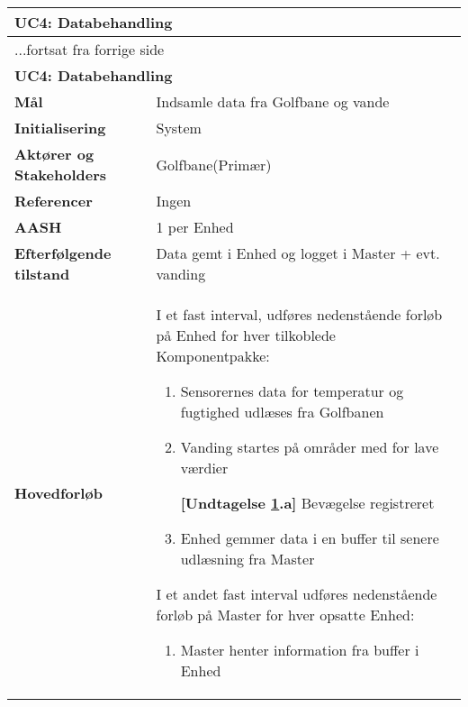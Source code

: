 \begin{center} \centering \label{UC4}
	\begin{longtable}{|p{5cm}|p{9cm}|}  %
	\hline
		\multicolumn{2}{|l|}{\textbf{UC4: Databehandling}} \\\hline %
		\endfirsthead
		
		\multicolumn{2}{l}{...fortsat fra forrige side} \\ \hline %
		\multicolumn{2}{|l|}{\textbf{UC4: Databehandling}} \\\hline %
		\endhead	
		
		\textbf{Mål}								&Indsamle data fra Golfbane og vande		\\\hline
		\textbf{Initialisering}					&System				\\\hline
		\textbf{Aktører og Stakeholders}			&Golfbane(Primær)	\\\hline
		\textbf{Referencer}						&Ingen				\\\hline
		\textbf{AASH}							&1 per Enhed			\\\hline
		\textbf{Efterfølgende tilstand}			&Data gemt i Enhed og logget i Master + evt. vanding 	\\\hline
		\textbf{Hovedforløb}						
		
		&I et fast interval, udføres nedenstående forløb på Enhed for hver tilkoblede Komponentpakke:
			\begin{enumerate}
			
				\item Sensorernes data for temperatur og fugtighed udlæses fra Golfbanen
				
				\item \label{uc4vandstart} Vanding startes på områder med for lave værdier
				
					\textbf{[Undtagelse \ref{uc4vandstart}.a]} \newline
					Bevægelse registreret 				
				
				\item Enhed gemmer data i en buffer til senere udlæsning fra Master				
			
			\end{enumerate}
			
			I et andet fast interval udføres nedenstående forløb på Master for hver opsatte Enhed:
			\begin{enumerate}[resume]
			
				\item Master henter information fra buffer i Enhed
				

\end{enumerate}
\end{longtable}
\end{center}
